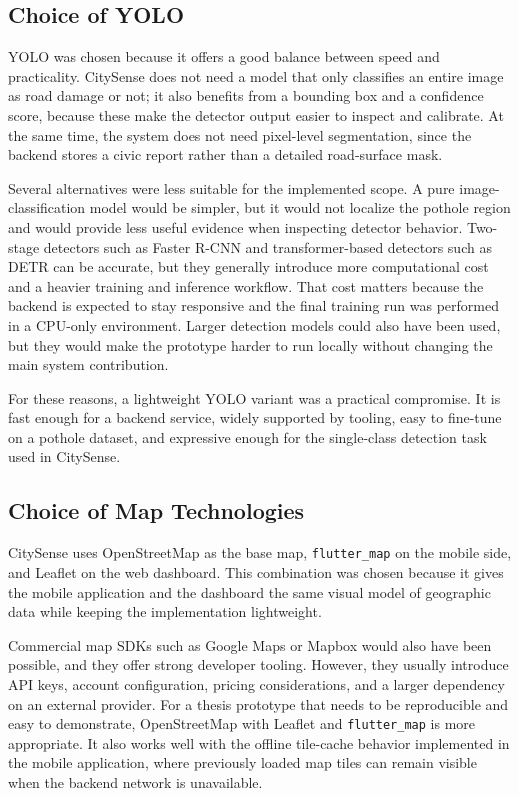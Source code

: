 \subsection{Choice of YOLO}

YOLO was chosen because it offers a good balance between speed and practicality. CitySense does not need a model that only classifies an entire image as road damage or not; it also benefits from a bounding box and a confidence score, because these make the detector output easier to inspect and calibrate. At the same time, the system does not need pixel-level segmentation, since the backend stores a civic report rather than a detailed road-surface mask.

Several alternatives were less suitable for the implemented scope. A pure image-classification model would be simpler, but it would not localize the pothole region and would provide less useful evidence when inspecting detector behavior. Two-stage detectors such as Faster R-CNN and transformer-based detectors such as DETR can be accurate, but they generally introduce more computational cost and a heavier training and inference workflow. That cost matters because the backend is expected to stay responsive and the final training run was performed in a CPU-only environment. Larger detection models could also have been used, but they would make the prototype harder to run locally without changing the main system contribution.

For these reasons, a lightweight YOLO variant was a practical compromise. It is fast enough for a backend service, widely supported by tooling, easy to fine-tune on a pothole dataset, and expressive enough for the single-class detection task used in CitySense.

\subsection{Choice of Map Technologies}

CitySense uses OpenStreetMap as the base map, \texttt{flutter\_map} on the mobile side, and Leaflet on the web dashboard. This combination was chosen because it gives the mobile application and the dashboard the same visual model of geographic data while keeping the implementation lightweight.

Commercial map SDKs such as Google Maps or Mapbox would also have been possible, and they offer strong developer tooling. However, they usually introduce API keys, account configuration, pricing considerations, and a larger dependency on an external provider. For a thesis prototype that needs to be reproducible and easy to demonstrate, OpenStreetMap with Leaflet and \texttt{flutter\_map} is more appropriate. It also works well with the offline tile-cache behavior implemented in the mobile application, where previously loaded map tiles can remain visible when the backend network is unavailable.

